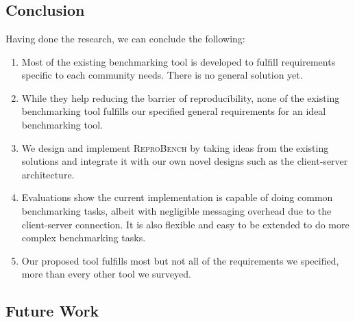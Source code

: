 \chapter{\chConclusion}
\label{ch:conclusion}



\section{Conclusion}

Having done the research, we can conclude the following:

\begin{enumerate}
    \item Most of the existing benchmarking tool is developed to fulfill requirements specific to each community needs. There is no general solution yet.
    \item While they help reducing the barrier of reproducibility, none of the existing benchmarking tool fulfills our specified general requirements for an ideal benchmarking tool.
    \item We design and implement \textsc{ReproBench} by taking ideas from the existing solutions and integrate it with our own novel designs such as the client-server architecture.
    \item Evaluations show the current implementation is capable of doing common benchmarking tasks, albeit with negligible messaging overhead due to the client-server connection. It is also flexible and easy to be extended to do more complex benchmarking tasks.
    \item Our proposed tool fulfills most but not all of the requirements we specified, more than every other tool we surveyed.
\end{enumerate}

\section{Future Work}

